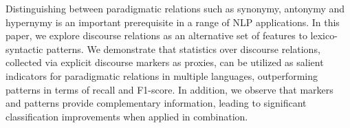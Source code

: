 Distinguishing between paradigmatic relations such as synonymy, antonymy and hypernymy is an important prerequisite in a range of NLP applications. In this paper, we explore discourse relations as an alternative set of features to lexico-syntactic patterns. We demonstrate that statistics over discourse relations, collected via explicit discourse markers as proxies, can be utilized as salient indicators for paradigmatic relations in multiple languages, outperforming patterns in terms of recall and F1-score. In addition, we observe that markers and patterns provide complementary information, leading to significant classification improvements when applied in combination.
